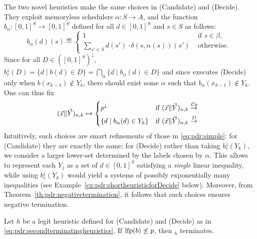 The two novel heuristics make the same choices in (Candidate) and (Decide). They exploit memoryless schedulers $\alpha \colon S \to A$, and the function $b_{\alpha} \colon [0, 1]^S \to [0, 1]^S$ defined for all $d\in [0, 1]^S $ and $s\in S$ as follows:
\begin{equation}\label{def:pdr:balpha}
	b_{\alpha}(d)(s) \eqdef \begin{cases}
		1                                                   & \text{ if } s \in \beta, \\
		\sum_{s'\in S} d(s') \cdot \delta(s, \alpha(s))(s') & \text{ otherwise}.
	\end{cases}
\end{equation}
Since for all $D\in ([0,1]^S)^\downarrow$, $b^\downarrow_r (D) = \{d \mid b(d) \in D\} = \bigcap_{\alpha}\{d \mid b_{\alpha} (d)\in D\}$ and since {\ADPDR} executes (Decide) only when $b(x_{k-1}) \notin Y_k$, there should exist some $\alpha$ such that $b_{\alpha} (x_{k-1})\notin Y_k$. One can thus fix
\begin{equation}\label{eq:pdr:secondterminatingheuristics}
	( \vec{x} \| \vec{Y} )_{n,k} \mapsto
	\begin{cases*}
		p^\downarrow                     & if $( \vec{x} \| \vec{Y} )_{n,k} \tr{\mathit{Ca}}$ \\
		\{d \mid b_{\alpha}(d) \in Y_k\} & if $( \vec{x} \| \vec{Y} )_{n,k} \tr{D}$
	\end{cases*}
\end{equation}
Intuitively, such choices are smart refinements of those in \eqref{eq:pdr:simple}: for (Candidate) they are exactly the same; for (Decide) rather than taking $b^\downarrow_r (Y_k)$, we consider a larger lower-set determined by the labels chosen by $\alpha$. This allows to represent each $Y_j$ as a set of $d\in [0, 1]^S $ satisfying a \emph{single} linear inequality, while using $b^\downarrow_r (Y_k)$ would yield a systems of possibly exponentially many inequalities (see Example~\ref{ex:pdr:shortheuristicforDecide} below). Moreover, from Theorem~\ref{th:pdr:negativetermination}, it follows that such choices ensures negative termination.

\begin{corollary}\label{cor:pdr:ADPDRtermination}
	Let $h$ be a legit heuristic defined for (Candidate) and (Decide) as in \eqref{eq:pdr:secondterminatingheuristics}.
	If $\text{lfp} (b) \not \leq p$, then \emph{\ADPDR}$_h$ terminates.
\end{corollary}

